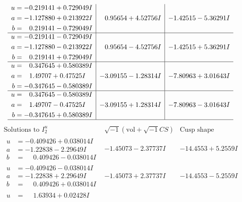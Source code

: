 \documentclass[1p]{elsarticle_modified}
\theoremstyle{definition}
\newcommand{\I}{\sqrt{-1}}
\begin{document}
$$\begin{array}{c|c|c}
\begin{aligned}
u &= -0.219141 + 0.729049 I \\
a &= -1.127880 + 0.213922 I \\
b &= \phantom{-}0.219141 - 0.729049 I\end{aligned}
 & \phantom{-}0.95654 + 4.52756 I & -1.42515 - 5.36291 I \\ \hline\begin{aligned}
u &= -0.219141 - 0.729049 I \\
a &= -1.127880 - 0.213922 I \\
b &= \phantom{-}0.219141 + 0.729049 I\end{aligned}
 & \phantom{-}0.95654 - 4.52756 I & -1.42515 + 5.36291 I \\ \hline\begin{aligned}
u &= \phantom{-}0.347645 + 0.580389 I \\
a &= \phantom{-}1.49707 + 0.47525 I \\
b &= -0.347645 - 0.580389 I\end{aligned}
 & -3.09155 - 1.28314 I & -7.80963 + 3.01643 I \\ \hline\begin{aligned}
u &= \phantom{-}0.347645 - 0.580389 I \\
a &= \phantom{-}1.49707 - 0.47525 I \\
b &= -0.347645 + 0.580389 I\end{aligned}
 & -3.09155 + 1.28314 I & -7.80963 - 3.01643 I\\
 \hline 
 \end{array}$$\newpage$$\begin{array}{c|c|c}  
\text{Solutions to }I^u_{2}& \I (\text{vol} + \sqrt{-1}CS) & \text{Cusp shape}\\
 \hline 
\begin{aligned}
u &= -0.409426 + 0.038014 I \\
a &= -1.22838 - 2.29649 I \\
b &= \phantom{-}0.409426 - 0.038014 I\end{aligned}
 & -1.45073 - 2.37737 I & -14.4553 + 5.2559 I \\ \hline\begin{aligned}
u &= -0.409426 - 0.038014 I \\
a &= -1.22838 + 2.29649 I \\
b &= \phantom{-}0.409426 + 0.038014 I\end{aligned}
 & -1.45073 + 2.37737 I & -14.4553 - 5.2559 I \\ \hline\begin{aligned}
u &= \phantom{-}1.63934 + 0.02428 I \\

\end{aligned}
\end{array}$$
\end{document}
